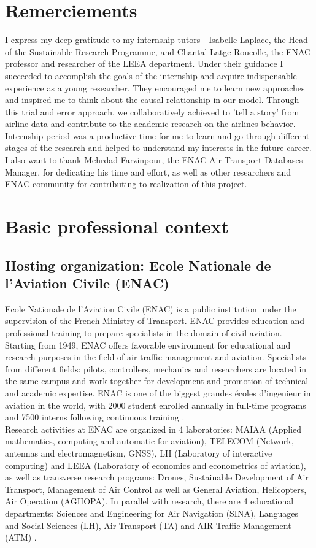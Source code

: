 \documentclass[titlepage, 11pt]{article}
\begin{document}
\newpage
\section{Remerciements}
\doublespacing 
\tab I express my deep gratitude to my internship tutors - Isabelle Laplace, the Head of the Sustainable Research Programme, and Chantal Latge-Roucolle, the ENAC professor and researcher of the LEEA department. Under their guidance I succeeded to accomplish the goals of the internship and acquire indispensable experience as a young researcher. They encouraged me to learn new approaches and inspired me to think about the causal relationship in our model. Through this trial and error approach, we collaboratively  achieved to 'tell a story' from airline data and contribute to the academic research on the airlines behavior. Internship period was a productive time for me to learn and go through different stages of the research and helped to understand my interests in the future career.\\
\tab I also want to thank Mehrdad Farzinpour, the ENAC Air Transport Databases Manager, for dedicating his time and effort, as well as other researchers and ENAC community for contributing to realization of this project. 


\newpage 
\section{Basic professional context}\label{profcontext}
\subsection{Hosting organization: Ecole Nationale de l'Aviation Civile (ENAC)}
\doublespacing 
\tab Ecole Nationale de l'Aviation Civile (ENAC) is a public institution under the supervision of the French Ministry of Transport. ENAC provides education and professional training to prepare specialists in the domain of civil aviation. Starting from 1949, ENAC offers favorable environment for educational and research purposes in the field of air traffic management and aviation. Specialists from different fields: pilots, controllers, mechanics and researchers are located in the same campus and work together for development and promotion of technical and academic expertise. ENAC is one of the biggest grandes écoles d'ingenieur in aviation in the world, with 2000 student enrolled annually in full-time programs and 7500 interns following continuous training \cite{ENAC}.\\ 
\tab Research activities at ENAC are organized in 4 laboratories: MAIAA (Applied mathematics, computing and automatic for  aviation), TELECOM (Network, antennas and electromagnetism, GNSS), LII (Laboratory of interactive computing) and LEEA (Laboratory of economics and econometrics of aviation), as well as transverse research programs: Drones, Sustainable Development of Air Transport, Management of Air Control as well as General Aviation, Helicopters, Air Operation (AGHOPA). In parallel with research, there are 4 educational departments: Sciences and Engineering for Air Navigation (SINA), Languages and Social Sciences (LH), Air Transport (TA) and AIR Traffic Management (ATM) \cite{ENAC}.
\end{document}
